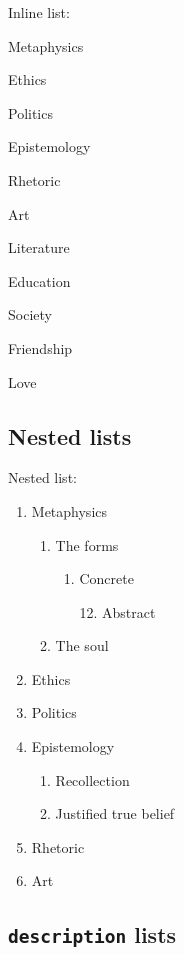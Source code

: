 \documentclass[11pt]{article}
\begin{document}
			Inline list: \\
			\begin{enumerate*}
				\item Metaphysics
				\item Ethics
				\item Politics
				\item Epistemology
				\item Rhetoric
				\item Art
				\item \mbox{Literature}
				\item Education
				\item Society
				\item Friendship
				\item Love
			\end{enumerate*}

		\subsection{Nested lists}
			Nested list:
			\begin{enumerate}
    			\item Metaphysics
					\begin{enumerate}
						\item The forms
							\begin{enumerate}
								\item Concrete
								\item[12.] Abstract
							\end{enumerate}
						\item The soul
					\end{enumerate}
				\item Ethics
				\item Politics
				\item Epistemology
					\begin{enumerate}
						\item Recollection
						\item Justified true belief
					\end{enumerate}
				\item Rhetoric
				\item Art
			\end{enumerate}

		\subsection{\texttt{description} lists}
\end{document}
